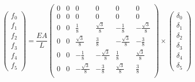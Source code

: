 \documentclass[a4paper]{article}
\begin{document}
\[\left(\begin{array}{r}f_0\\ f_1\\f_2\\f_3\\f_4\\f_5 \end{array}\right) 
=\frac{EA}{L}
\left(\begin{array}{ccrrrr} 
0&0&0&0&0&0\\
0&0&0&0&0&0\\
0&0&\frac 18&\frac{\sqrt 3}{8}&-\frac 18&-\frac{\sqrt 3}{8}\\
0&0&\frac{\sqrt 3}{8}&\frac 38&-\frac{\sqrt 3}{8}&-\frac 38\\
0&0&-\frac 18&-\frac{\sqrt 3}{8}&\frac 18&\frac{\sqrt 3}{8}\\
0&0&-\frac{\sqrt 3}{8}&-\frac 38&\frac{\sqrt 3}{8}&\frac 38\\
\end{array}\right)
\times
\left(\begin{array}{r} \delta_0\\ \delta_1\\ \delta_2\\ \delta_3\\ \delta_4\\ \delta_5   \end{array}\right)
\]
\end{document}
